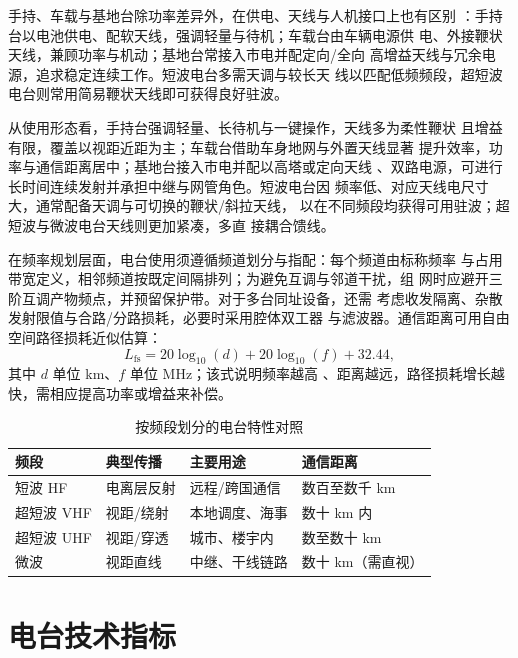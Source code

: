 手持、车载与基地台除功率差异外，在供电、天线与人机接口上也有区别
：手持台以电池供电、配软天线，强调轻量与待机；车载台由车辆电源供
电、外接鞭状天线，兼顾功率与机动；基地台常接入市电并配定向/全向
高增益天线与冗余电源，追求稳定连续工作。短波电台多需天调与较长天
线以匹配低频频段，超短波电台则常用简易鞭状天线即可获得良好驻波。

从使用形态看，手持台强调轻量、长待机与一键操作，天线多为柔性鞭状
且增益有限，覆盖以视距近距为主；车载台借助车身地网与外置天线显著
提升效率，功率与通信距离居中；基地台接入市电并配以高塔或定向天线
、双路电源，可进行长时间连续发射并承担中继与网管角色。短波电台因
频率低、对应天线电尺寸大，通常配备天调与可切换的鞭状/斜拉天线，
以在不同频段均获得可用驻波；超短波与微波电台天线则更加紧凑，多直
接耦合馈线。

在频率规划层面，电台使用须遵循频道划分与指配：每个频道由标称频率
与占用带宽定义，相邻频道按既定间隔排列；为避免互调与邻道干扰，组
网时应避开三阶互调产物频点，并预留保护带。对于多台同址设备，还需
考虑收发隔离、杂散发射限值与合路/分路损耗，必要时采用腔体双工器
与滤波器。通信距离可用自由空间路径损耗近似估算：
\begin{equation}
L_{\mathrm{fs}} = 20\log_{10}(d) + 20\log_{10}(f) + 32.44,
\end{equation}
其中 $d$ 单位 km、$f$ 单位 MHz；该式说明频率越高
、距离越远，路径损耗增长越快，需相应提高功率或增益来补偿。

\begin{table}[htbp]
\centering
\caption{按频段划分的电台特性对照}
\label{tab:station_band}
\begin{tabular}{|p{2.6cm}|p{3.4cm}|p{4.2cm}|p{3.4cm}|}
\hline
\textbf{频段} & \textbf{典型传播} & \textbf{主要用途} & \textbf{通信距离} \\
\hline
短波 HF & 电离层反射 & 远程/跨国通信 & 数百至数千 km \\
\hline
超短波 VHF & 视距/绕射 & 本地调度、海事 & 数十 km 内 \\
\hline
超短波 UHF & 视距/穿透 & 城市、楼宇内 & 数至数十 km \\
\hline
微波 & 视距直线 & 中继、干线链路 & 数十 km（需直视） \\
\hline
\end{tabular}
\end{table}

\section{电台技术指标}
\label{sec:radio_station_specs}

